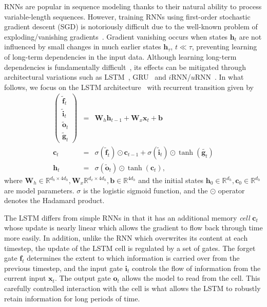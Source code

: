\documentclass{article} %
\newcommand{\vect}[1]{\mathbf{#1}}
\newcommand{\mat}[1]{\mathbf{#1}}
\newcommand{\ewprod}{\odot}
\newcommand{\reals}{\mathbb{R}}
\begin{document}
RNNs are popular in sequence modeling thanks to their natural ability to process variable-length sequences.
However, training RNNs using first-order stochastic gradient descent (SGD) is notoriously difficult
due to the well-known problem of exploding/vanishing gradients~\citep{bengio1994learning,hochreiter1991untersuchungen,pascanudifficulty}.
Gradient vanishing occurs when states $\vect{h}_t$ are not influenced by small changes in much earlier states $\vect{h}_{\tau}$, $t \ll \tau$,
preventing learning of long-term dependencies in the input data.
Although learning long-term dependencies is fundamentally difficult~\citep{bengio1994learning},
its effects can be mitigated through architectural variations such as LSTM~\citep{lstm}, GRU~\citep{cho2014learning} and $i$RNN/$u$RNN~\citep{le2015simple,urnn}.
In what follows, we focus on the LSTM architecture~\citep{lstm} with recurrent transition given by
\begin{eqnarray}
\left(\begin{array}{ccc}
\tilde{\vect{f}}_t \\
\tilde{\vect{i}}_t \\
\tilde{\vect{o}}_t \\
\tilde{\vect{g}}_t
\end{array}\right)
 &=&
 \mat{W}_h \vect{h}_{t-1} +
 \mat{W}_x \vect{x}_t +
 \vect{b}
 \\
\vect{c}_t &= &\sigma(\tilde{\vect{f}}_t) \ewprod \vect{c}_{t-1} +
\sigma(\tilde{\vect{i}}_t) \ewprod \tanh(\tilde{\vect{g}_t}) \\
\vect{h}_t &= &\sigma(\tilde{\vect{o}}_t) \ewprod \tanh(\vect{c}_t),
\end{eqnarray}
where $\vect{W}_h \in \reals^{d_h \times 4 d_h}, \vect{W}_x \reals^{d_x \times 4 d_h}, \vect{b} \in \reals^{4 d_h}$
and the initial states $\vect{h}_0 \in \reals^{d_h}, \vect{c}_0 \in \reals^{d_h}$ %
are model parameters.
$\sigma$ is the logistic sigmoid function, and the $\ewprod$ operator denotes the Hadamard product.

The LSTM differs from simple RNNs in that it has an additional memory \emph{cell} 
$\vect{c}_t$ whose update is nearly linear which allows the gradient to flow back 
through time more easily. In addition, unlike the RNN which overwrites its content 
at each timestep, the update of the LSTM cell is regulated by a set of gates.
The forget gate $\vect{f}_t$ determines the extent to which information is carried over from the previous timestep,
and the input gate $\vect{i}_t$ controls the flow of information from the current input $\vect{x}_t$.
The output gate $\vect{o}_t$ allows the model to read from the cell. This carefully 
controlled interaction with the cell is what allows the LSTM to robustly retain 
information for long periods of time.
\end{document}

